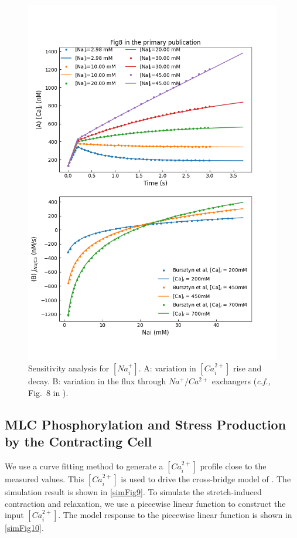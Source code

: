 \documentclass[fleqn,10pt]{physiome}
\begin{document}
\begin{figure}
\begin{minipage}[t]{\dimexpr.5\textwidth-0.3em}
  \label{simFig7}
\end{minipage}\hfill
\begin{minipage}[t]{\dimexpr.5\textwidth-0.3em}
  \centering
  \includegraphics[width=0.9\linewidth]{./figs/simFig8.png}
  \caption{Sensitivity analysis for $[Na_{i}^{+}]$. A: variation in $[Ca_{i}^{2+}]$ rise and decay. B: variation in the flux through $Na^{+}/Ca^{2+}$ exchangers (\emph{c.f.,} Fig.~8 in \citet{bursztyn2007mathematical}).}
  \label{simFig8}
\end{minipage}
\end{figure}

\subsection{MLC Phosphorylation and Stress Production by the Contracting Cell}
We use a curve fitting method to generate a $[Ca_{i}^{2+}]$ profile close to the measured values. This $[Ca_{i}^{2+}]$ is used to drive the cross-bridge model of \citet{hai1988cross}. The simulation result is shown in \autoref{simFig9}. To simulate the stretch-induced contraction and relaxation, we use a piecewise linear function to construct the input $[Ca_{i}^{2+}]$. The model response to the piecewise linear function is shown in \autoref{simFig10}.
\end{document}
